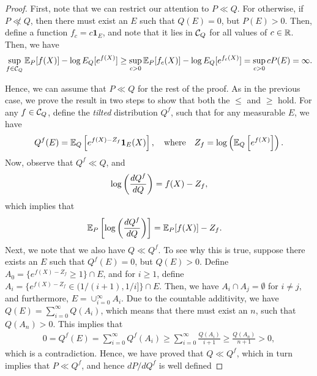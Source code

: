             \begin{proof}

                First, note that we can restrict our attention to $P\ll Q$. For otherwise, if $P \not \ll Q$, then there must exist an $E$ such that $Q(E)=0$, but $P(E)>0$. Then, define a function $f_c = c \boldsymbol{1}_E$, and note that it lies in $\mathcal{C}_Q$ for all values of $c \in \mathbb{R}$. Then, we have 
                \begin{align}
                    \sup_{f \in \mathcal{C}_Q} \mathbb{E}_P[f(X)] - \log E_Q[e^{f(X)}] \geq \sup_{c > 0}  \mathbb{E}_P[f_c(X)] - \log E_Q[e^{f_c(X)}] = \sup_{c >0} c P(E) = \infty.
                \end{align}

                Hence, we can assume that $P \ll Q$ for the rest of the proof. 
                As in the previous case, we prove the result in two steps to show that both the $\leq$ and $\geq$ hold.
                For any $f \in \mathcal{C}_Q$, define the \emph{tilted} distribution $Q^f$, such that for any measurable $E$, we have 
                \begin{align}
                    Q^f(E) = \mathbb{E}_Q\left[ e^{f(X)-Z_f} \boldsymbol{1}_E(X)\right], \quad \text{where} \quad 
                    Z_f = \log\left( \mathbb{E}_Q\left[ e^{f(X)} \right]\right). 
                \end{align}
                Now, observe that $Q^f \ll Q$, and 
                \begin{align}
                    \log \left( \frac{dQ^f}{dQ} \right) = f(X) - Z_f, 
                \end{align}
                which implies that 
                \begin{align}
                 \mathbb{E}_P\left[ \log \left( \frac{dQ^f}{dQ} \right)    \right] &= \mathbb{E}_P[f(X)] - Z_f. 
                \end{align}
                Next, we note that we also have $Q \ll Q^f$. To see why this is true, suppose there exists an $E$ such that $Q^f(E)=0$, but $Q(E) >0$. Define $A_0 = \{ e^{f(X)-Z_f} \geq 1\} \cap E$, and for $i \geq 1$, define $A_i = \{ e^{f(X) - Z_f} \in (1/(i+1), 1/i]\} \cap E$. Then, we have $A_i \cap A_j = \emptyset$ for $i \neq j$, and furthermore, $E = \cup_{i=0}^{\infty} A_i$. Due to the countable additivity, we have $Q(E) = \sum_{i=0}^{\infty} Q(A_i)$, which means that there must exist an $n$, such that $Q(A_n)>0$. This implies that
                \begin{align}
                    0 = Q^f(E) = \sum_{i=0}^{\infty} Q^f(A_i) \geq \sum_{i=0}^{\infty} \frac{Q(A_i)}{i+1} \geq \frac{Q(A_n)}{n+1} > 0, 
                \end{align}
                which is a contradiction. Hence, we have proved that $Q \ll Q^f$, which in turn implies that $P \ll Q^f$, and hence $dP/dQ^f$ is well defined


\end{proof}
